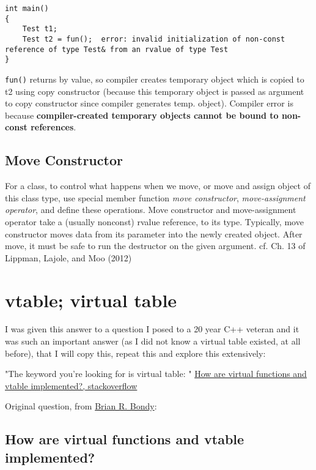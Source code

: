 \documentclass[10pt]{amsart}
\begin{document}
\begin{multicols*}{2}
\begin{lstlisting}
int main()
{
	Test t1;
	Test t2 = fun();  error: invalid initialization of non-const reference of type Test& from an rvalue of type Test
}
\end{lstlisting}

\verb|fun()| returns by value, so compiler creates temporary object which is copied to t2 using copy constructor (because this temporary object is passed as argument to copy constructor since compiler generates temp. object).  
Compiler error is because \textbf{compiler-created temporary objects cannot be bound to non-const references}. 



\subsection{Move Constructor}  

For a class, to control what happens when we move, or move and assign object of this class type, use special member function \emph{move constructor}, \emph{move-assignment operator}, and define these operations.  Move constructor and move-assignment operator take a (usually nonconst) rvalue reference, to its type.  Typically, move constructor moves data from its parameter into the newly created object.  After move, it must be safe to run the destructor on the given argument.  cf. Ch. 13 of Lippman, Lajole, and Moo (2012) \cite{LLM2012}



\section{vtable; virtual table}  

I was given this answer to a question I posed to a 20 year C++ veteran and it was such an important answer (as I did not know a virtual table existed, at all before), that I will copy this, repeat this and explore this extensively:  

"The keyword you're looking for is virtual table: " \href{https://stackoverflow.com/questions/99297/how-are-virtual-functions-and-vtable-implemented}{How are virtual functions and vtable implemented?, stackoverflow}  

Original question, from \href{https://stackoverflow.com/users/3153/brian-r-bondy}{Brian R. Bondy}:  

\subsection{How are virtual functions and vtable implemented?}


\end{multicols*}
\end{document}
